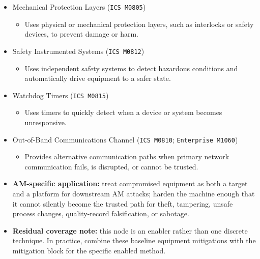 \documentclass[10pt,a4paper,oneside]{report}
\begin{document}
\begin{itemize}
\begin{itemize}
\begin{itemize}
\item Creates and protects backups of critical data and configurations so systems can recover after compromise or disruption.
\end{itemize}
\item Mechanical Protection Layers (\texttt{ICS M0805})
\begin{itemize}
\item Uses physical or mechanical protection layers, such as interlocks or safety devices, to prevent damage or harm.
\end{itemize}
\item Safety Instrumented Systems (\texttt{ICS M0812})
\begin{itemize}
\item Uses independent safety systems to detect hazardous conditions and automatically drive equipment to a safer state.
\end{itemize}
\item Watchdog Timers (\texttt{ICS M0815})
\begin{itemize}
\item Uses timers to quickly detect when a device or system becomes unresponsive.
\end{itemize}
\item Out-of-Band Communications Channel (\texttt{ICS M0810}; \texttt{Enterprise M1060})
\begin{itemize}
\item Provides alternative communication paths when primary network communication fails, is disrupted, or cannot be trusted.
\end{itemize}
\end{itemize}
\end{itemize}

\begin{itemize}
\item \textbf{AM-specific application:} treat compromised equipment as both a target and a platform for downstream AM attacks; harden the machine enough that it cannot silently become the trusted path for theft, tampering, unsafe process changes, quality-record falsification, or sabotage.
\end{itemize}

\begin{itemize}
\item \textbf{Residual coverage note:} this node is an enabler rather than one discrete technique. In practice, combine these baseline equipment mitigations with the mitigation block for the specific enabled method.
\end{itemize}
\end{document}
